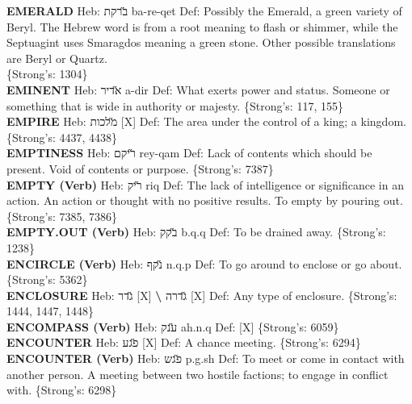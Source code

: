 {\textbf{EMERALD} Heb: {\large\H ברקת} ba-re-qet Def: Possibly the Emerald, a green variety of Beryl. The Hebrew word is from a root meaning to flash or shimmer, while the Septuagint uses Smaragdos meaning a green stone. Other possible translations are Beryl or Quartz.\hfill{}\\

 \{Strong's: 1304\}\hfill{}\\

\textbf{EMINENT} Heb: {\large\H אדיר} a-dir Def: What exerts power and status. Someone or something that is wide in authority or majesty. \{Strong's: 117, 155\}\hfill{}\\

\textbf{EMPIRE} Heb: {\large\H מלכות} {[}X{]} Def: The area under the control of a king; a kingdom. \{Strong's: 4437, 4438\}\hfill{}\\

\textbf{EMPTINESS} Heb: {\large\H ריקם} rey-qam Def: Lack of contents which should be present. Void of contents or purpose. \{Strong's: 7387\}\hfill{}\\

\textbf{EMPTY (Verb)} Heb: {\large\H ריק} riq Def: The lack of intelligence or significance in an action. An action or thought with no positive results. To empty by pouring out. \{Strong's: 7385, 7386\}\hfill{}\\

\textbf{EMPTY.OUT (Verb)} Heb: {\large\H בקק} b.q.q Def: To be drained away. \{Strong's: 1238\}\hfill{}\\

\textbf{ENCIRCLE (Verb)} Heb: {\large\H נקף} n.q.p Def: To go around to enclose or go about. \{Strong's: 5362\}\hfill{}\\

\textbf{ENCLOSURE} Heb: {\large\H גדר} {[}X{]} \textbf{\textbackslash{}} {\large\H גדרה} {[}X{]} Def: Any type of enclosure. \{Strong's: 1444, 1447, 1448\}\hfill{}\\

\textbf{ENCOMPASS (Verb)} Heb: {\large\H ענק} ah.n.q Def: {[}X{]} \{Strong's: 6059\}\hfill{}\\

\textbf{ENCOUNTER} Heb: {\large\H פגע} {[}X{]} Def: A chance meeting. \{Strong's: 6294\}\hfill{}\\

\textbf{ENCOUNTER (Verb)} Heb: {\large\H פגש} p.g.sh Def: To meet or come in contact with another person. A meeting between two hostile factions; to engage in conflict with. \{Strong's: 6298\}\hfill{}\\

}

